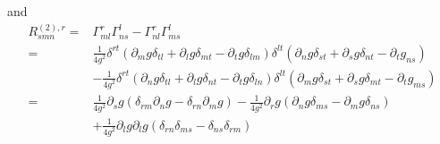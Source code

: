 and 
\begin{align}
R^{(2),r}_{smn}=&\Gamma^{r}_{ml}\Gamma^l_{ns} - \Gamma^r_{nl}\Gamma^l_{ms}\\
=&\frac{1}{4g^2}\delta^{rt}(\partial_m g\delta_{tl} + \partial_l g\delta_{mt} - \partial_t g\delta_{lm})\delta^{lt}(\partial_ng\delta_{st} + \partial_sg\delta_{nt} - \partial_tg_{ns}) \nonumber\\
&-\frac{1}{4g^2}\delta^{rt}(\partial_n g\delta_{tl} + \partial_l g\delta_{nt} - \partial_t g\delta_{ln})\delta^{lt}(\partial_mg\delta_{st} + \partial_sg\delta_{mt} - \partial_tg_{ms})\\
%
= &\frac{1}{4g^2}\partial_s g(\delta_{rm}\partial_ng -\delta_{rn}\partial_mg) - \frac{1}{4g^2}\partial_r g(\partial_ng\delta_{ms} - \partial_mg\delta_{ns}) \nonumber\\
& + \frac{1}{4g^2}\partial_l g\partial_lg(\delta_{rn}\delta_{ms}- \delta_{ns}\delta_{rm})
\end{align}
